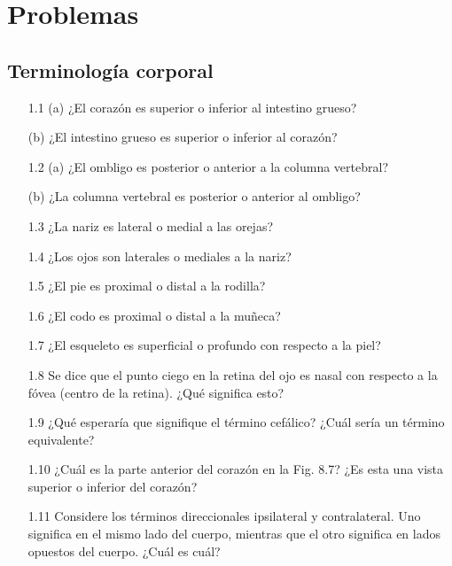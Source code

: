 \documentclass[12pt]{book}
\begin{document}
\section*{Problemas}

\subsection*{Terminología corporal}

\begin{enumerate}
\item[1.1] (a) ¿El corazón es superior o inferior al intestino grueso?
  
  (b) ¿El intestino grueso es superior o inferior al corazón?

\item[1.2] (a) ¿El ombligo es posterior o anterior a la columna vertebral?
  
  (b) ¿La columna vertebral es posterior o anterior al ombligo?

\item[1.3] ¿La nariz es lateral o medial a las orejas?

\item[1.4] ¿Los ojos son laterales o mediales a la nariz?

\item[1.5] ¿El pie es proximal o distal a la rodilla?

\item[1.6] ¿El codo es proximal o distal a la muñeca?

\item[1.7] ¿El esqueleto es superficial o profundo con respecto a la piel?

\item[1.8] Se dice que el punto ciego en la retina del ojo es nasal con respecto a la fóvea (centro de la retina). ¿Qué significa esto?

\item[1.9] ¿Qué esperaría que signifique el término cefálico? ¿Cuál sería un término equivalente?

\item[1.10] ¿Cuál es la parte anterior del corazón en la Fig. 8.7? ¿Es esta una vista superior o inferior del corazón?

\item[1.11] Considere los términos direccionales ipsilateral y contralateral. Uno significa en el mismo lado del cuerpo, mientras que el otro significa en lados opuestos del cuerpo. ¿Cuál es cuál?


\end{enumerate}
\end{document}
